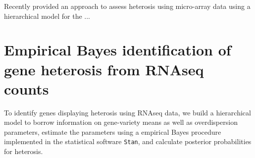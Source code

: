 \documentclass[useAMS,usenatbib,referee]{biom}
\begin{document}
Recently \citep{ji2014estimation} provided an approach to assess heterosis using micro-array data using a hierarchical model for the ...


% 
% 
% 


\section{Empirical Bayes identification of gene heterosis from RNAseq counts}


To identify genes displaying heterosis using RNAseq data, we build a hierarchical model to borrow information on gene-variety means as well as overdispersion parameters, estimate the parameters using a empirical Bayes procedure implemented in the statistical software {\tt Stan}, and calculate posterior probabilities for heterosis. 

\end{document}
